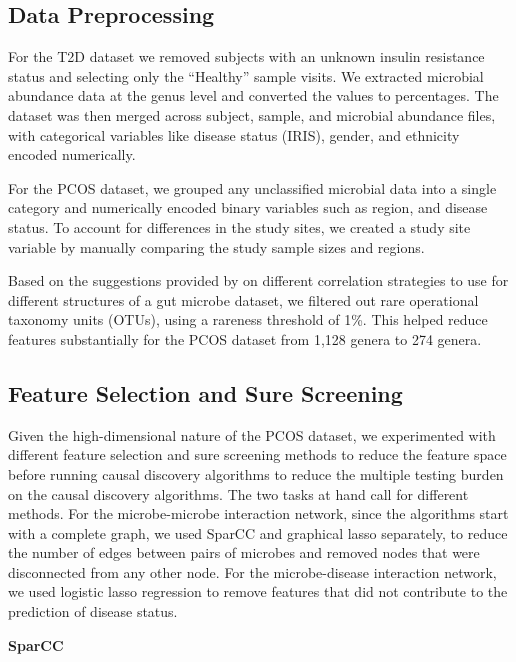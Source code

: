 \documentclass[12pt,letterpaper]{article}
\begin{document}
\subsection{Data Preprocessing}

For the T2D dataset we removed subjects with an unknown insulin resistance status and selecting only the “Healthy” sample visits. We extracted microbial abundance data at the genus level and converted the values to percentages. The dataset was then merged across subject, sample, and microbial abundance files, with categorical variables like disease status (IRIS), gender, and ethnicity encoded numerically.

For the PCOS dataset, we grouped any unclassified microbial data into a single category and numerically encoded binary variables such as region, and disease status. To account for differences in the study sites, we created a study site variable by manually comparing the study sample sizes and regions.

Based on the suggestions provided by \citep{weiss2016correlationbenchmark} on different correlation strategies to use for different structures of a gut microbe dataset, we filtered out rare operational taxonomy units (OTUs), using a rareness threshold of 1\%. This helped reduce features substantially for the PCOS dataset from 1,128 genera to 274 genera. 

\subsection{Feature Selection and Sure Screening}

Given the high-dimensional nature of the PCOS dataset, we experimented with different feature selection and sure screening methods to reduce the feature space before running causal discovery algorithms to reduce the multiple testing burden on the causal discovery algorithms. The two tasks at hand call for different methods. For the microbe-microbe interaction network, since the algorithms start with a complete graph, we used SparCC and graphical lasso separately, to reduce the number of edges between pairs of microbes and removed nodes that were disconnected from any other node. For the microbe-disease interaction network, we used logistic lasso regression to remove features that did not contribute to the prediction of disease status. \newline

\textbf{SparCC}
\end{document}
